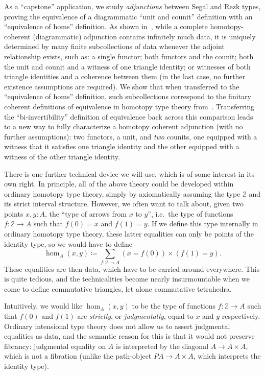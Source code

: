 \documentclass{amsart}
\theoremstyle{plain}
\theoremstyle{definition}
\theoremstyle{remark}
\numberwithin{equation}{section}
\newcommand{\defeq}{\coloneqq}
\newcommand{\two}{\mathbb{2}}
\begin{document}
As a ``capstone'' application, we study \emph{adjunctions} between Segal and Rezk types, proving the equivalence of a diagrammatic ``unit and counit'' definition with an ``equivalence of homs'' definition.
As shown in~\cite{RVadj}, while a complete homotopy-coherent (diagrammatic) adjunction contains infinitely much data, it is uniquely determined by many finite subcollections of data {whenever the adjoint relationship exists,} such as: a single functor; both functors and the counit; both the unit and counit and a witness of one triangle identity; or witnesses of both triangle identities and a coherence between them (in the last case, no further existence assumptions are required).
We show that when transferred to the ``equivalence of homs'' definition, such subcollections correspond to the finitary coherent definitions of equivalence in homotopy type theory from~\cite[Chapter 4]{hottbook}.
Transferring the ``bi-invertibility'' definition of equivalence back across this comparison leads to a new way to fully characterize a homotopy coherent adjunction (with no further assumptions): two functors, a unit, and \emph{two} counits, one equipped with a witness that it satisfies one triangle identity and the other equipped with a witness of the other triangle identity.

There is one further technical device we will use, which is of some interest in its own right.
In principle, all of the above theory could be developed within ordinary homotopy type theory, simply by axiom\-atically assuming the type $\two$ and its strict interval structure.
However, we often want to talk about, given two points $x,y:A$, the ``type of arrows from $x$ to $y$'', i.e.\ the type of functions $f:\two\to A$ such that $f(0)=x$ and $f(1)=y$.
If we define this type internally in ordinary homotopy type theory, these latter equalities can only be points of the identity type, so we would have to define
\[ \hom_A(x,y) \defeq \sum_{f:\two\to A} (x=f(0)) \times (f(1)=y). \]
These equalities are then data, which have to be carried around everywhere.
This is quite tedious, and the technicalities become nearly insurmountable when we come to define commutative triangles, let alone commutative tetrahedra.

Intuitively, we would like $\hom_A(x,y)$ to be the type of functions $f:\two\to A$ such that $f(0)$ and $f(1)$ are \emph{strictly}, or \emph{judgmentally}, equal to $x$ and $y$ respectively.
Ordinary intensional type theory does not allow us to assert judgmental equalities as data, and the semantic reason for this is that it would not preserve fibrancy: judgmental equality on $A$ is interpreted by the diagonal $A\to A\times A$, which is not a fibration (unlike the path-object $P A \to A\times A$, which interprets the identity type).
\end{document}
